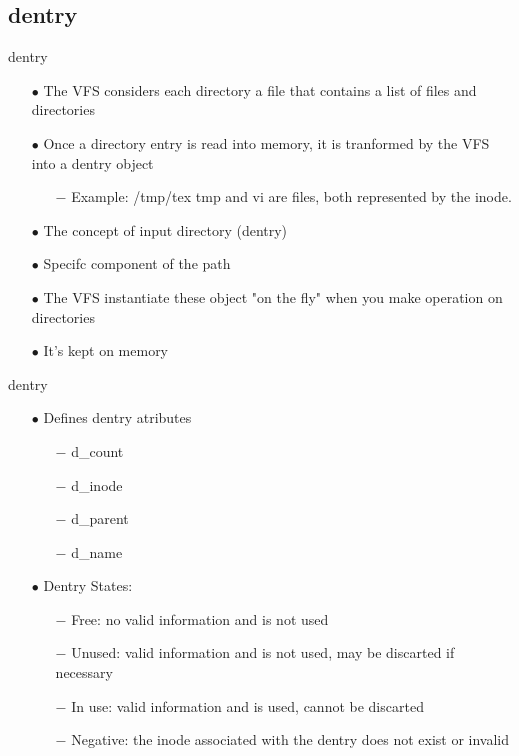 \documentclass{beamer}
\begin{document}
\subsection{dentry}
\begin{frame}{dentry}
	
	\begin{itemize}[<+->]

		\item[$\bullet$]{The VFS considers each directory a file that contains a list of files and directories}
		\item[$\bullet$]{Once a directory entry is read into memory, it is tranformed by the VFS into a dentry object}
			\begin{itemize}
				\item[$-$]{Example: /tmp/tex \newline tmp and vi are files, both represented by the inode.}
			\end{itemize}
		\item[$\bullet$]{The concept of input directory (dentry)}
		\item[$\bullet$]{Specifc component of the path}
		\item[$\bullet$]{The VFS instantiate these object "on the fly" when you make operation on directories}
		\item[$\bullet$]{It's kept on memory}
	\end{itemize}

\end{frame}

\begin{frame}{dentry}
	
	\begin{itemize}[<+->]
		\item[$\bullet$]{Defines dentry atributes}
			\begin{itemize}
				\item[$-$]{d\_count}
				\item[$-$]{d\_inode}
				\item[$-$]{d\_parent}
				\item[$-$]{d\_name}
			\end{itemize}

		\item[$\bullet$]{Dentry States:}
			\begin{itemize}
				\item[$-$]{Free: no valid information and is not used}
				\item[$-$]{Unused: valid information and is not used, may be discarted if necessary}
				\item[$-$]{In use: valid information and is used, cannot be discarted}
				\item[$-$]{Negative: the inode associated with the dentry does not exist or invalid}
			\end{itemize}
	\end{itemize}

\end{frame}
\end{document}
